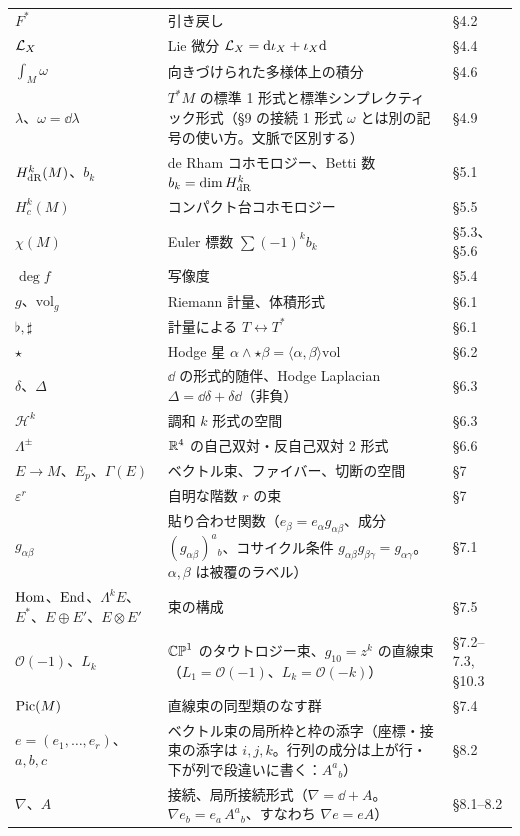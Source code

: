 \begin{longtable}{@{}p{4.7cm}p{8.0cm}>{\raggedright\arraybackslash}p{2.1cm}@{}}
$F^*$ & 引き戻し & §4.2 \\
$\mathcal L_X$ & Lie 微分 $\mathcal L_X=\mathrm{d}\iota_X+\iota_X\mathrm{d}$ & §4.4 \\
$\int_M\omega$ & 向きづけられた多様体上の積分 & §4.6 \\
$\lambda$、$\omega=\dd\lambda$ & $T^*M$ の標準 1 形式と標準シンプレクティック形式（§9 の接続 1 形式 $\omega$ とは別の記号の使い方。文脈で区別する） & §4.9 \\
$H^k_{\rm dR}(M)$、$b_k$ & de Rham コホモロジー、Betti 数 $b_k=\dim H^k_{\rm dR}$ & §5.1 \\
$H^k_c(M)$ & コンパクト台コホモロジー & §5.5 \\
$\chi(M)$ & Euler 標数 $\sum(-1)^kb_k$ & §5.3、§5.6 \\
$\deg f$ & 写像度 & §5.4 \\
$g$、$\mathrm{vol}_g$ & Riemann 計量、体積形式 & §6.1 \\
$\flat,\sharp$ & 計量による $T\leftrightarrow T^*$ & §6.1 \\
$\star$ & Hodge 星 $\alpha\wedge\star\beta=\langle\alpha,\beta\rangle\mathrm{vol}$ & §6.2 \\
$\delta$、$\Delta$ & $\dd$ の形式的随伴、Hodge Laplacian $\Delta=\dd\delta+\delta\dd$（非負） & §6.3 \\
$\mathcal H^k$ & 調和 $k$ 形式の空間 & §6.3 \\
$\Lambda^\pm$ & $\mathbb R^4$ の自己双対・反自己双対 2 形式 & §6.6 \\
$E\to M$、$E_p$、$\Gamma(E)$ & ベクトル束、ファイバー、切断の空間 & §7 \\
$\varepsilon^r$ & 自明な階数 $r$ の束 & §7 \\
$g_{\alpha\beta}$ & 貼り合わせ関数（$e_\beta=e_\alpha g_{\alpha\beta}$、成分 $(g_{\alpha\beta})^a{}_b$、コサイクル条件 $g_{\alpha\beta}g_{\beta\gamma}=g_{\alpha\gamma}$。$\alpha,\beta$ は被覆のラベル） & §7.1 \\
$\mathrm{Hom}$、$\mathrm{End}$、$\Lambda^kE$、$E^*$、$E\oplus E'$、$E\otimes E'$ & 束の構成 & §7.5 \\
$\mathcal O(-1)$、$L_k$ & $\mathbb{CP}^1$ のタウトロジー束、$g_{10}=z^k$ の直線束（$L_1=\mathcal O(-1)$、$L_k=\mathcal O(-k)$） & §7.2--7.3, §10.3 \\
$\mathrm{Pic}(M)$ & 直線束の同型類のなす群 & §7.4 \\
$e=(e_1,\dots,e_r)$、$a,b,c$ & ベクトル束の局所枠と枠の添字（座標・接束の添字は $i,j,k$。行列の成分は上が行・下が列で段違いに書く：$A^a{}_b$） & §8.2 \\
$\nabla$、$A$ & 接続、局所接続形式（$\nabla=\dd+A$。$\nabla e_b=e_a\,A^a{}_b$、すなわち $\nabla e=eA$） & §8.1--8.2 \\

\end{longtable}
